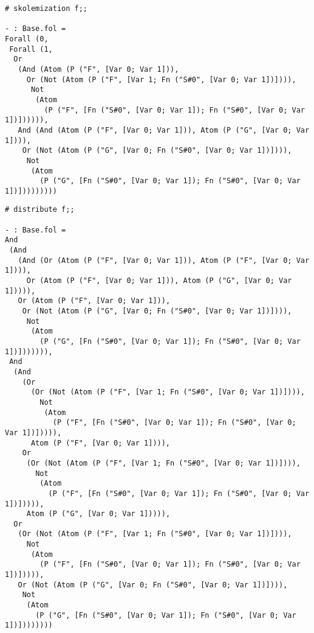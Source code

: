 \documentclass[a4paper]{article}
\begin{document}


\begin{lstlisting}[name=interp]
# skolemization f;;

- : Base.fol =
Forall (0,
 Forall (1,
  Or
   (And (Atom (P ("F", [Var 0; Var 1])),
     Or (Not (Atom (P ("F", [Var 1; Fn ("S#0", [Var 0; Var 1])]))),
      Not
       (Atom
         (P ("F", [Fn ("S#0", [Var 0; Var 1]); Fn ("S#0", [Var 0; Var 1])]))))),
   And (And (Atom (P ("F", [Var 0; Var 1])), Atom (P ("G", [Var 0; Var 1]))),
    Or (Not (Atom (P ("G", [Var 0; Fn ("S#0", [Var 0; Var 1])]))),
     Not
      (Atom
        (P ("G", [Fn ("S#0", [Var 0; Var 1]); Fn ("S#0", [Var 0; Var 1])]))))))))
\end{lstlisting}



\begin{lstlisting}[name=interp]
# distribute f;;

- : Base.fol =
And
 (And
   (And (Or (Atom (P ("F", [Var 0; Var 1])), Atom (P ("F", [Var 0; Var 1]))),
     Or (Atom (P ("F", [Var 0; Var 1])), Atom (P ("G", [Var 0; Var 1])))),
   Or (Atom (P ("F", [Var 0; Var 1])),
    Or (Not (Atom (P ("G", [Var 0; Fn ("S#0", [Var 0; Var 1])]))),
     Not
      (Atom
        (P ("G", [Fn ("S#0", [Var 0; Var 1]); Fn ("S#0", [Var 0; Var 1])])))))),
 And
  (And
    (Or
      (Or (Not (Atom (P ("F", [Var 1; Fn ("S#0", [Var 0; Var 1])]))),
        Not
         (Atom
           (P ("F", [Fn ("S#0", [Var 0; Var 1]); Fn ("S#0", [Var 0; Var 1])])))),
      Atom (P ("F", [Var 0; Var 1]))),
    Or
     (Or (Not (Atom (P ("F", [Var 1; Fn ("S#0", [Var 0; Var 1])]))),
       Not
        (Atom
          (P ("F", [Fn ("S#0", [Var 0; Var 1]); Fn ("S#0", [Var 0; Var 1])])))),
     Atom (P ("G", [Var 0; Var 1])))),
  Or
   (Or (Not (Atom (P ("F", [Var 1; Fn ("S#0", [Var 0; Var 1])]))),
     Not
      (Atom
        (P ("F", [Fn ("S#0", [Var 0; Var 1]); Fn ("S#0", [Var 0; Var 1])])))),
   Or (Not (Atom (P ("G", [Var 0; Fn ("S#0", [Var 0; Var 1])]))),
    Not
     (Atom
       (P ("G", [Fn ("S#0", [Var 0; Var 1]); Fn ("S#0", [Var 0; Var 1])])))))))
\end{lstlisting}

\renewcommand{\treel}{0.4}

\renewcommand{\treel}{0.8}
\end{document}
